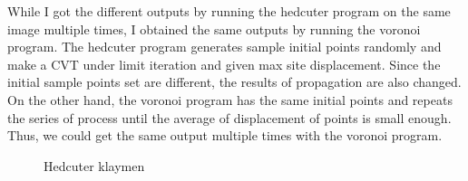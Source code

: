 \documentclass[11pt]{article}
\begin{document}
While I got the different outputs by running the hedcuter program on the same image multiple times, I obtained the same outputs by running the voronoi program. The hedcuter program generates sample initial points randomly and make a CVT under limit iteration and given max site displacement. Since the initial sample points set are different, the results of propagation are also changed. On the other hand, the voronoi program has the same initial points and repeats the series of process until the average of displacement of points is small enough. Thus, we could get the same output multiple times with the voronoi program.

	\begin{figure}[ht] 
	\begin{center} 
	\caption{Hedcuter klaymen}
	\label{fig:varydiskhedcut} 
	\end{center} 
	\end{figure}
\end{document}
